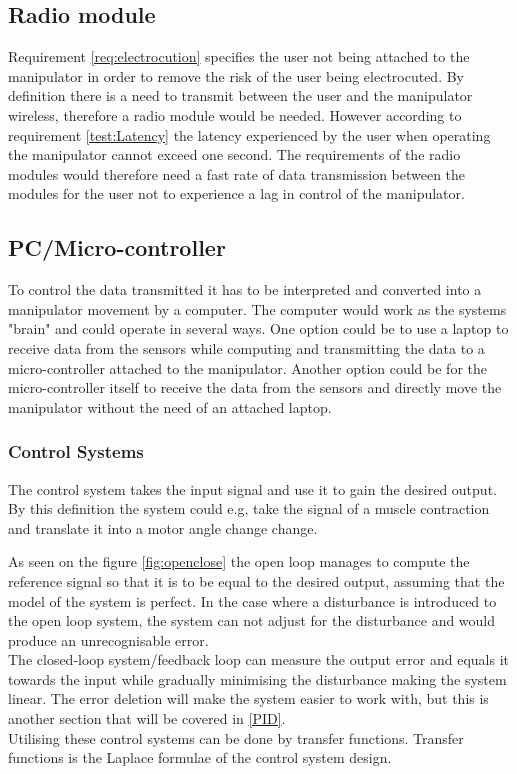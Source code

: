 \subsection*{Radio module}
Requirement \ref{req:electrocution} specifies the user not being attached to the manipulator in order to remove the risk of the user being electrocuted. By definition there is a need to transmit between the user and the manipulator wireless, therefore a radio module would be needed. However according to requirement \ref{test:Latency} the latency experienced by the user when operating the manipulator cannot exceed one second. The requirements of the radio modules would therefore need a fast rate of data transmission between the modules for the user not to experience a lag in control of the manipulator.

\subsection*{PC/Micro-controller}
To control the data transmitted it has to be interpreted and converted into a manipulator movement by a computer. The computer would work as the systems "brain" and could operate in several ways. One option could be to use a laptop to receive data from the sensors while computing and transmitting the data to a micro-controller attached to the manipulator. Another option could be for the micro-controller itself to receive the data from the sensors and directly move the manipulator without the need of an attached laptop. 
\subsubsection*{Control Systems}
The control system takes the input signal and use it to gain the desired output. By this definition the system could  e.g, take the signal of a muscle contraction and translate it into a motor angle change change.

As seen on the figure \ref{fig:openclose} the open loop manages to compute the reference signal so that it is to be equal to the desired output, assuming that the model of the system is perfect. In the case where a disturbance is introduced to the open loop system, the system can not adjust for the disturbance and would produce an unrecognisable error.\\
The closed-loop system/feedback loop can measure the output error and equals it towards the input while gradually minimising the disturbance making the system linear. The error deletion will make the system easier to work with, but this is another section that will be covered in \ref{PID}.\\ 
Utilising these control systems can be done by transfer functions. Transfer functions is the Laplace formulae of the control system design.\\


